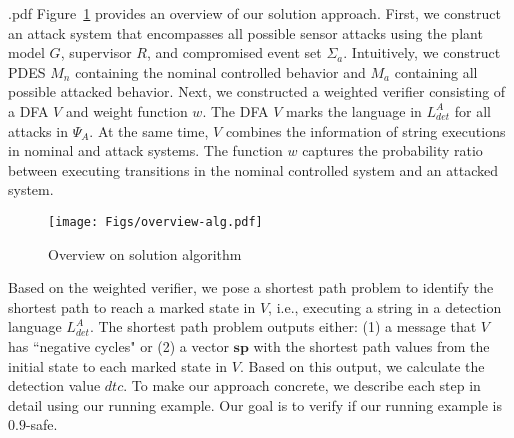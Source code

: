 .pdf%
Figure~\ref{fig:overview_solution} provides an overview of our solution approach. 
First, we construct an attack system that encompasses all possible sensor attacks using the plant model $G$, supervisor $R$, and compromised event set $\Sigma_a$.
Intuitively, we construct PDES $M_n$ containing the nominal controlled behavior and $M_a$ containing all possible attacked behavior.
Next, we constructed a weighted verifier consisting of a DFA $V$ and weight function $w$.
The DFA $V$ marks the language in $L^A_{det}$ for all attacks in $\Psi_A$.
At the same time, $V$ combines the information of string executions in nominal and attack systems.
The function $w$ captures the probability ratio between executing transitions in the nominal controlled system and an attacked system.

\begin{figure}[h]
    \centering
    \texttt{[image: Figs/overview-alg.pdf]} 
    \caption{Overview on solution algorithm} 
    \label{fig:overview_solution}
\end{figure}

Based on the weighted verifier, we pose a shortest path problem to identify the shortest path to reach a marked state in $V$, i.e., executing a string in a detection language $L^A_{det}$.
The shortest path problem outputs either: (1) a message that $V$ has ``negative cycles" or (2) a vector $\mathbf{sp}$ with the shortest path values from the initial state to each marked state in $V$.
Based on this output, we calculate the detection value $dtc$.
To make our approach concrete, we describe each step in detail using our running example.
Our goal is to verify if our running example is $0.9$-safe.



